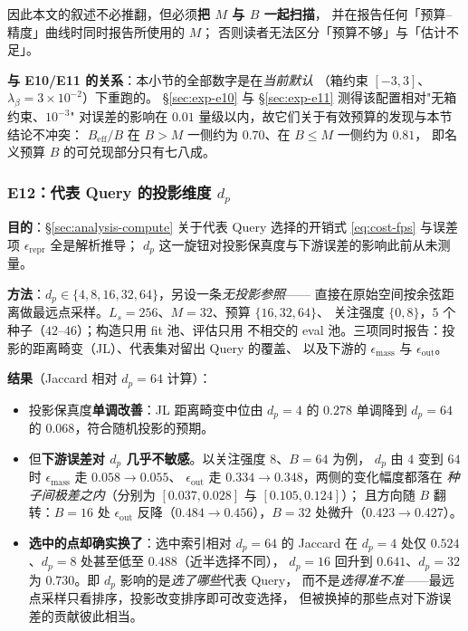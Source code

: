 因此本文的叙述不必推翻，但必须\textbf{把 $M$ 与 $B$ 一起扫描}，
并在报告任何「预算--精度」曲线时同时报告所使用的 $M$；
否则读者无法区分「预算不够」与「估计不足」。

\textbf{与 E10/E11 的关系}：本小节的全部数字是在\emph{当前默认}
（箱约束 $[-3,3]$、$\lambda_\beta=3\times10^{-2}$）下重跑的。
\S\ref{sec:exp-e10} 与 \S\ref{sec:exp-e11} 测得该配置相对"无箱约束、$10^{-3}$"
对误差的影响在 $0.01$ 量级以内，故它们关于有效预算的发现与本节结论不冲突：
$B_{\text{eff}}/B$ 在 $B>M$ 一侧约为 $0.70$、在 $B\le M$ 一侧约为 $0.81$，
即名义预算 $B$ 的可兑现部分只有七八成。

\subsubsection{E12：代表 Query 的投影维度 $d_p$}
\label{sec:exp-e12}

\textbf{目的}：\S\ref{sec:analysis-compute} 关于代表 Query 选择的开销式
\eqref{eq:cost-fps} 与误差项 $\epsilon_{\text{repr}}$ 全是解析推导；
$d_p$ 这一旋钮对投影保真度与下游误差的影响此前从未测量。

\textbf{方法}：$d_p\in\{4,8,16,32,64\}$，另设一条\emph{无投影参照}——
直接在原始空间按余弦距离做最远点采样。$L_s=256$、$M=32$、预算 $\{16,32,64\}$、
关注强度 $\{0,8\}$，$5$ 个种子（$42$--$46$）；构造只用 fit 池、评估只用
不相交的 eval 池。三项同时报告：投影的距离畸变（JL）、代表集对留出 Query 的覆盖、
以及下游的 $\epsilon_{\text{mass}}$ 与 $\epsilon_{\text{out}}$。

\textbf{结果}（Jaccard 相对 $d_p=64$ 计算）：

\begin{itemize}
  \item 投影保真度\textbf{单调改善}：JL 距离畸变中位由 $d_p=4$ 的 $0.278$
        单调降到 $d_p=64$ 的 $0.068$，符合随机投影的预期。
  \item 但\textbf{下游误差对 $d_p$ 几乎不敏感}。以关注强度 $8$、$B=64$ 为例，
        $d_p$ 由 $4$ 变到 $64$ 时 $\epsilon_{\text{mass}}$ 走 $0.058\to0.055$、
        $\epsilon_{\text{out}}$ 走 $0.334\to0.348$，两侧的变化幅度都落在
        \emph{种子间极差之内}（分别为 $[0.037,0.028]$ 与 $[0.105,0.124]$）；
        且方向随 $B$ 翻转：$B=16$ 处 $\epsilon_{\text{out}}$ 反降（$0.484\to0.456$），$B=32$ 处微升（$0.423\to0.427$）。
  \item \textbf{选中的点却确实换了}：选中索引相对 $d_p=64$ 的 Jaccard 在
        $d_p=4$ 处仅 $0.524$、$d_p=8$ 处甚至低至 $0.488$（近半选择不同），
        $d_p=16$ 回升到 $0.641$、$d_p=32$ 为 $0.730$。即 $d_p$ 影响的是\emph{选了哪些}代表 Query，
        而不是\emph{选得准不准}——最远点采样只看排序，投影改变排序即可改变选择，
        但被换掉的那些点对下游误差的贡献彼此相当。
\end{itemize}

